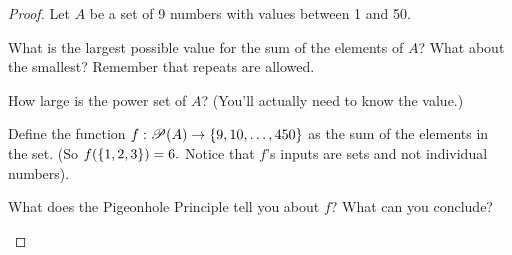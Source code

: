 \begin{mdframed}[backgroundcolor=gray!10!]
\begin{proof} Let $A$ be a set of 9 numbers with values between 1 and 50.

\begin{mdframed}[backgroundcolor=white]
\begin{question}[resume]
\item What is the largest possible value for the sum of the elements of $A$?  What about the smallest?  Remember that repeats are allowed.
\vspace{.5in}
\item How large is the power set of $A$?  (You'll actually need to know the value.)
\vspace{.5in}
\end{question}
\end{mdframed}
Define the function $f: \mathscr{P}(A) \to \left\{9,10,\ldots,450\right\}$ as the sum of the elements in the set.  (So $f(\left\{1,2,3\right\})=6.$  Notice that $f$'s inputs are sets and not individual numbers).\\
\begin{mdframed}[backgroundcolor=white]
\begin{question}[start=5]
\item What does the Pigeonhole Principle tell you about $f$?  What can you conclude?
\vspace{3in}
\end{question}
\end{mdframed}
\end{proof}
\end{mdframed}





